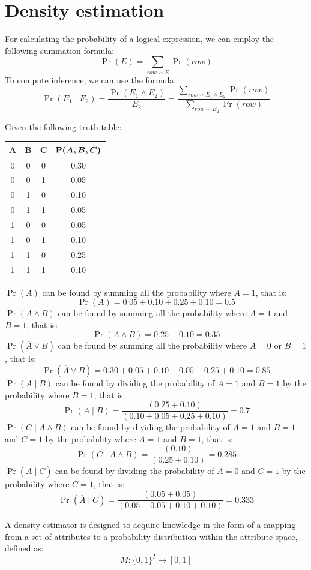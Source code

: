 \section{Density estimation}

For calculating the probability of a logical expression, we can employ the following summation formula:
\[\Pr(E)=\sum_{row \backsim E}\Pr(row)\]
To compute inference, we can use the formula:
\[\Pr(E_1\mid E_2)=\dfrac{\Pr(E_1 \land E_2)}{E_2}=\dfrac{\sum_{row \backsim E_1 \land E_2}\Pr(row)}{\sum_{row \backsim E_2}\Pr(row)}\]
\begin{example}
    Given the following truth table: 
    \begin{table}[H]
        \centering
        \begin{tabular}{ccc|c}
        \hline
        $\boldsymbol{A}$ & $\boldsymbol{B}$ & $\boldsymbol{C}$ & $\boldsymbol{\textnormal{\textbf{P}}(A,B,C)}$ \\ \hline
        0   & 0   & 0   & 0.30       \\ 
        0   & 0   & 1   & 0.05       \\ 
        0   & 1   & 0   & 0.10       \\ 
        0   & 1   & 1   & 0.05       \\ 
        1   & 0   & 0   & 0.05       \\ 
        1   & 0   & 1   & 0.10       \\ 
        1   & 1   & 0   & 0.25       \\ 
        1   & 1   & 1   & 0.10       \\ \hline
        \end{tabular}
    \end{table}
    $\Pr(A)$ can be found by summing all the probability where $A=1$, that is: 
    \[\Pr(A) = 0.05 + 0.10 + 0.25 + 0.10 = 0.5\]
    $\Pr(A \land B)$ can be found by summing all the probability where $A=1$ and $B=1$, that is: 
    \[\Pr(A \land B) = 0.25 + 0.10 = 0.35\]
    $\Pr(\overline{A} \lor B)$ can be found by summing all the probability where $A=0$ or $B=1$, that is: 
    \[\Pr(\overline{A} \lor B) = 0.30 + 0.05 + 0.10 + 0.05 + 0.25 + 0.10 = 0.85\]
    $\Pr(A \mid  B)$ can be found by dividing the probability of $A=1$ and $B=1$ by the probability where $B=1$, that is: 
    \[\Pr(A \mid  B) = \dfrac{(0.25+0.10)}{(0.10+0.05+0.25+0.10)}=0.7\]
    $\Pr(C \mid  A \land B)$ can be found by dividing the probability of $A=1$ and $B=1$ and $C=1$ by the probability where $A=1$ and $B=1$, that is: 
    \[\Pr(C \mid  A \land B) = \dfrac{(0.10)}{(0.25+0.10)}=0.285\]
    $\Pr(\overline{A} \mid  C)$ can be found by dividing the probability of $A=0$ and $C=1$ by the probability where $C=1$, that is: 
    \[\Pr(\overline{A} \mid  C) = \dfrac{(0.05+0.05)}{(0.05+0.05+0.10+0.10)}=0.333\]
\end{example}
\begin{definition}
    A density estimator is designed to acquire knowledge in the form of a mapping from a set of attributes to a probability distribution within the attribute space, defined as:
    \[M:\{0,1\}^I \rightarrow [0,1]\]
\end{definition}

